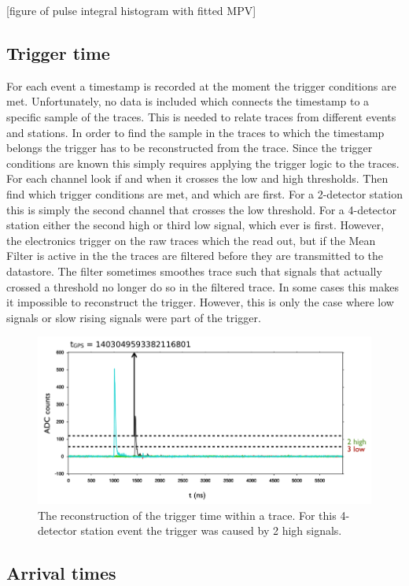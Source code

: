[figure of pulse integral histogram with fitted MPV]


\subsection{Trigger time}
\label{sec:trigger_time}

For each event a \gps timestamp is recorded at the moment the trigger conditions are met. Unfortunately, no data is included which connects the \gps timestamp to a specific sample of the traces. This is needed to relate traces from different events and stations. In order to find the sample in the traces to which the \gps timestamp belongs the trigger has to be reconstructed from the trace. Since the trigger conditions are known this simply requires applying the trigger logic to the traces. For each channel look if and when it crosses the low and high thresholds. Then find which trigger conditions are met, and which are first. For a 2-detector station this is simply the second channel that crosses the low threshold. For a 4-detector station either the second high or third low signal, which ever is first. However, the \hisparc electronics trigger on the raw traces which the \adcs read out, but if the Mean Filter is active in the \daq the traces are filtered before they are transmitted to the datastore. The filter sometimes smoothes trace such that signals that actually crossed a threshold no longer do so in the filtered trace. In some cases this makes it impossible to reconstruct the trigger. However, this is only the case where low signals or slow rising signals were part of the trigger.

\begin{figure}
    \centering
    \includegraphics[width=0.7\linewidth]{plots/processing/trigger_time.png}
    \caption{The reconstruction of the trigger time within a trace. For this 4-detector station event the trigger was caused by 2 high signals.}
    \label{fig:trigger_time}
\end{figure}


\subsection{Arrival times}

